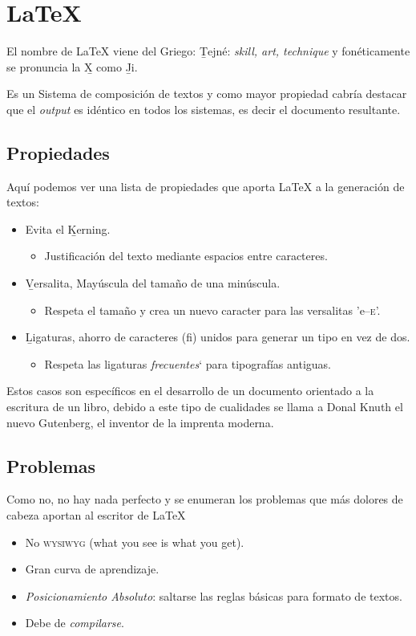 \documentclass[11pt]{article}
\begin{document}
\section{\LaTeX{}}

El nombre de \LaTeX{} viene del Griego: \b{Tejné}: \emph{skill, art, technique} y fon\'eticamente se pronuncia la \b{X} como \b{Ji}.

Es un Sistema de composici\'on de textos y como mayor propiedad cabría destacar que el \emph{output} es id\'entico en todos los sistemas, es decir el documento resultante.

\subsection{Propiedades}

Aqu\'i podemos ver una lista de propiedades que aporta \LaTeX{} a la generaci\'on de textos:

\begin{itemize}
	\item Evita el \b{Kerning}.
	\begin{itemize}
		\item Justificaci\'on del texto mediante espacios entre caracteres.
	\end{itemize}
	\item \b{Versalita}, May\'uscula del tamaño de una min\'uscula.
	\begin{itemize}
		\item Respeta el tamaño y crea un nuevo caracter para las versalitas 'e--\textsc{e}'.
	\end{itemize}
	\item \b{Ligaturas}, ahorro de caracteres (fi) unidos para generar un tipo en vez de dos.
	\begin{itemize}
		\item Respeta las ligaturas \emph{frecuentes}` para tipograf\'ias antiguas.
	\end{itemize}
\end{itemize}

Estos casos son espec\'ificos en el desarrollo de un documento orientado a la escritura de un libro, debido a este tipo de cualidades se llama a Donal Knuth el nuevo Gutenberg, el inventor de la imprenta moderna.

\subsection{Problemas}

Como no, no hay nada perfecto y se enumeran los problemas que m\'as dolores de cabeza aportan al escritor de \LaTeX{}
\begin{itemize}
	\item No \textsc{wysiwyg} (what you see is what you get).
	\item Gran curva de aprendizaje.
	\item \emph{Posicionamiento Absoluto}: saltarse las reglas b\'asicas para formato de textos.
	\item Debe de \emph{compilarse}.
\end{itemize}
\end{document}
